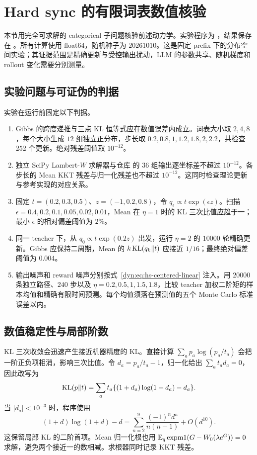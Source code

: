 \section{Hard sync 的有限词表数值核验}
\label{dyn:sec:hard-sync-experiments}

本节用完全可求解的 categorical 子问题核验前述动力学。实验程序为 ，结果保存在 。所有计算使用 float64，随机种子为 $20261010$。这是固定 prefix 下的分布空间实验；其证据范围是精确更新与受控输出扰动，LLM 的参数共享、随机梯度和 rollout 变化需要分别测量。

\subsection{实验问题与可证伪的判据}

实验在运行前固定以下判据。
\begin{enumerate}
 \item Gibbs 的跨度递推与三点 KL 恒等式应在数值误差内成立。词表大小取 $2,4,8$，每个大小生成 $12$ 组独立正分布，步长取 $0.2,0.8,1,1.2,1.8,2,2.2$，共检查 $252$ 个更新。绝对残差阈值取 $10^{-12}$。
 \item 独立 SciPy Lambert-$W$ 求解器与仓库  的 $36$ 组输出逐坐标差不超过 $10^{-12}$。各步长的 Mean KKT 残差与归一化残差也不超过 $10^{-12}$。这同时检查理论更新与参考实现的对应关系。
 \item 固定 $t=(0.2,0.3,0.5)$、$z=(-1,0.2,0.8)$，令 $q_\epsilon\propto t\exp(\epsilon z)$。扫描 $\epsilon=0.4,0.2,0.1,0.05,0.02,0.01$，Mean 在 $\eta=1$ 时的 KL 三次比值应趋于一；最小 $\epsilon$ 的相对偏差阈值为 $2\%$。
 \item 同一 teacher 下，从 $q_0\propto t\exp(0.2z)$ 出发，运行 $\eta=2$ 的 $10000$ 轮精确更新。Gibbs 应保持二周期，Mean 的 $k\operatorname{KL}(q_k\Vert t)$ 应接近 $1/16$；最终绝对偏差阈值为 $0.004$。
 \item 输出噪声和 reward 噪声分别按式~\eqref{dyn:eq:hs-centered-linear} 注入。用 $20000$ 条独立路径、$240$ 步以及 $\eta=0.2,0.5,1,1.5,1.8$，比较 teacher 加权二阶矩的样本均值和精确有限时间预测。每个均值须落在预测值的五个 Monte Carlo 标准误差以内。
\end{enumerate}

\subsection{数值稳定性与局部阶数}

KL 三次收敛会迅速产生接近机器精度的 KL。直接计算 $\sum_a p_a\log(p_a/t_a)$ 会把一阶正负项相消，影响三次比值。令 $d_a=p_a/t_a-1$，归一化给出 $\sum_a t_ad_a=0$，因此改写为
\begin{equation*}
 \operatorname{KL}(p\Vert t)=\sum_a t_a\{(1+d_a)\log(1+d_a)-d_a\}.
\end{equation*}
当 $|d_a|<10^{-3}$ 时，程序使用
\begin{equation*}
 (1+d)\log(1+d)-d
 =\sum_{n=2}^{9}\frac{(-1)^n d^n}{n(n-1)}+O(d^{10}).
\end{equation*}
这保留局部 KL 的二阶首项。Mean 归一化根也用 $\mathbb E_q\operatorname{expm1}(G-W_0(\lambda e^G))=0$ 求解，避免两个接近一的数相减。求根器同时记录 KKT 残差。

